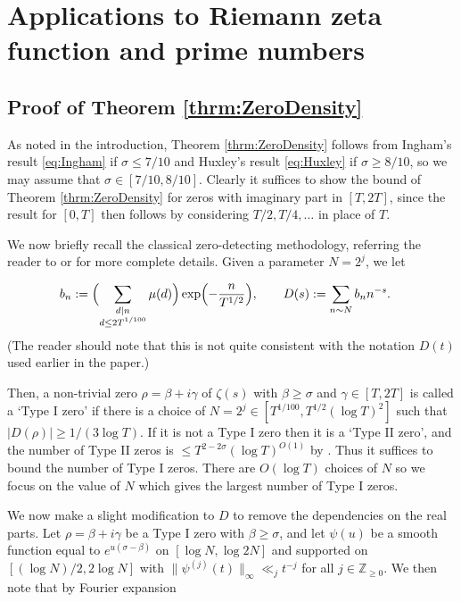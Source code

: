 \documentclass{amsart}
\theoremstyle{plain}
\numberwithin{equation}{section}
\begin{document}
%
%
%
%


\section{Applications to Riemann zeta function and prime numbers}


\subsection{Proof of Theorem \ref{thrm:ZeroDensity}}

As noted in the introduction, Theorem \ref{thrm:ZeroDensity} follows from Ingham's result \eqref{eq:Ingham} if $\sigma\le 7/10$ and Huxley's result \eqref{eq:Huxley} if $\sigma\ge 8/10$, so we may assume that $\sigma\in[7/10,8/10]$. Clearly it suffices to show the bound of Theorem \ref{thrm:ZeroDensity} for zeros with imaginary part in $[T,2T]$, since the result for $[0,T]$ then follows by considering $T/2,T/4,\dots$ in place of $T$.

We now briefly recall the classical zero-detecting methodology, referring the reader to \cite[Chapter 12]{M3} or \cite[Appendix C]{MP} for more complete details. Given a parameter $N=2^j$, we let

\begin{align*}
b_n&:=\Bigl(\sum_{\substack{d|n\\ d\le 2T^{1/100}}}\mu(d)\Bigr)\exp\Bigl(-\frac{n}{T^{1/2}}\Bigr),\qquad D(s):=\sum_{n\sim N}b_n n^{-s}.
\end{align*}
(The reader should note that this is not quite consistent with the notation $D(t)$ used earlier in the paper.)

Then, a non-trivial zero $\rho=\beta+i\gamma$ of $\zeta(s)$ with $\beta\ge \sigma$ and $\gamma\in [T,2T]$ is called a `Type I zero' if there is a choice of $N=2^j\in [T^{1/100},T^{1/2}(\log{T})^2]$ such that $|D(\rho)|\ge 1/(3\log{T})$. If it is not a Type I zero then it is a `Type II zero', and the number of Type II zeros is $\le T^{2-2\sigma}(\log{T})^{O(1)}$ by \cite[Lemma 24]{MP}. Thus it suffices to bound the number of Type I zeros. There are $O(\log{T})$ choices of $N$ so we focus on the value of $N$ which gives the largest number of Type I zeros.

We now make a slight modification to $D$ to remove the dependencies on the real parts. Let $\rho=\beta+i\gamma$ be a Type I zero with $\beta\ge \sigma$, and let $\psi(u)$ be a smooth function equal to $e^{u(\sigma-\beta)}$ on $[\log{N},\log{2N}]$ and supported on $[(\log{N})/2,2\log{N}]$ with $\|\psi^{(j)}(t)\|_\infty \ll_j t^{-j}$ for all $j\in \mathbb{Z}_{\ge 0}$. We then note that by Fourier expansion
\end{document}
